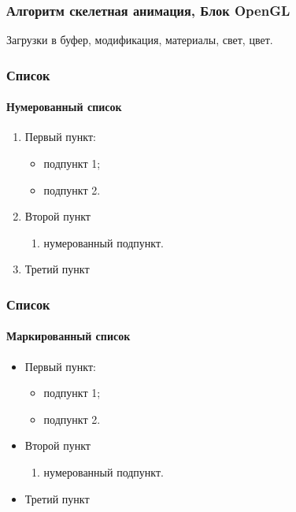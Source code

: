 \documentclass{beamer}
\begin{document}
\begin{frame}
\frametitle{Алгоритм скелетная анимация, Блок OpenGL}
	Загрузки в буфер, модификация, материалы, свет, цвет.
\end{frame}




\begin{frame}
\frametitle{Список}
\framesubtitle{Нумерованный список}
	\begin{enumerate} 
		\item Первый пункт:
		\begin{itemize}
			\item подпункт 1;
			\item подпункт 2.
		\end{itemize}
		\item Второй пункт
		\begin{enumerate}
			\item нумерованный подпункт.
		\end{enumerate} 
		\item Третий пункт
	\end{enumerate} 
\end{frame}

\begin{frame}
\frametitle{Список}
\framesubtitle{Маркированный список}
	\begin{itemize}
		\item Первый пункт:
		\begin{itemize}
			\item подпункт 1;
			\item подпункт 2.
		\end{itemize}
		\item Второй пункт
		\begin{enumerate}
			\item нумерованный подпункт.
		\end{enumerate}
		\item Третий пункт
	\end{itemize}
\end{frame}
\end{document}
